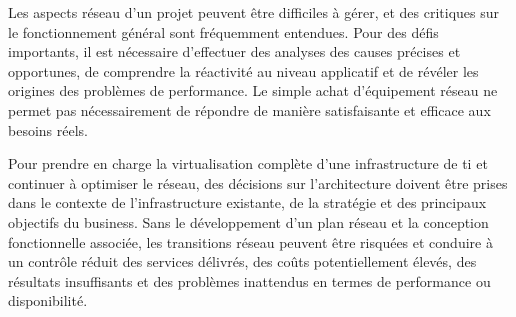 Les aspects réseau d'un projet peuvent être difficiles à gérer, et des critiques sur le fonctionnement général sont fréquemment entendues. Pour des défis importants, il est nécessaire d'effectuer des analyses des causes précises et opportunes, de comprendre la réactivité au niveau applicatif et de révéler les origines des problèmes de performance. Le simple achat d'équipement réseau ne permet pas nécessairement de répondre de manière satisfaisante et efficace aux besoins réels.





Pour prendre en charge la virtualisation complète d'une infrastructure de \gls{ti} et continuer à optimiser le réseau, des décisions sur l'architecture doivent être prises dans le contexte de l'infrastructure existante, de la stratégie et des principaux objectifs du business. Sans le développement d'un plan réseau et la conception fonctionnelle associée, les transitions réseau peuvent être risquées et conduire à un contrôle réduit des services délivrés, des coûts potentiellement élevés, des résultats insuffisants et des problèmes inattendus en termes de performance ou disponibilité. 


